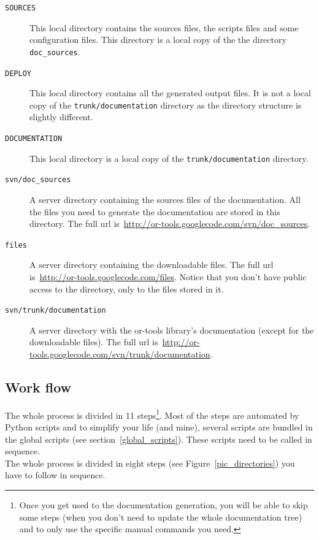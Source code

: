 \documentclass[a4paper,10pt]{article}
\newcommand{\code}[1]{\texttt{#1}}
\begin{document}
\begin{description}
 \item[\code{SOURCES}] This local directory contains the sources files, the scripts files and some configuration files. This directory is a local copy of the the directory \code{doc\_sources}.
                       
 \item[\code{DEPLOY}]  This local directory contains all the generated output files. It is not a local copy of the \code{trunk/documentation} directory as the directory structure is slightly different.
 \item[\code{DOCUMENTATION}] This local directory is a local copy of the \code{trunk/documentation} directory.
 \item[\code{svn/doc\_sources}] A server directory containing the sources files of the documentation. All the files you need to generate the documentation are stored in this directory. The full url is~\href{http://or-tools.googlecode.com/svn/doc\_sources}{http://or-tools.googlecode.com/svn/doc\_sources}.
 \item[\code{files}] A server directory containing the downloadable files. The full url is~\href{http://or-tools.googlecode.com/files}{http://or-tools.googlecode.com/files}. Notice that you don't have public access to the directory, only to the files stored in it.
 \item[\code{svn/trunk/documentation}] A server directory with the or-tools library's documentation (except for the downloadable files). The full url is~\href{http://or-tools.googlecode.com/svn/trunk/documentation}{http://or-tools.googlecode.com/svn/trunk/documentation}.
\end{description}

\subsection{Work flow}

The whole process is divided in 11 steps\footnote{Once you get used to the documentation generation, you will be able to skip some steps (when you don't need to update the whole documentation tree) and to only use the specific manual commands you need.}. Most of the steps are automated by Python scripts and to simplify your life (and mine), several scripts are bundled in the global scripts (see section~\ref{global_scripts}). These scripts need to be called in sequence.\\

The whole process is divided in eight steps (see Figure~\ref{pic_directories}) you have to follow in sequence. 
\end{document}
